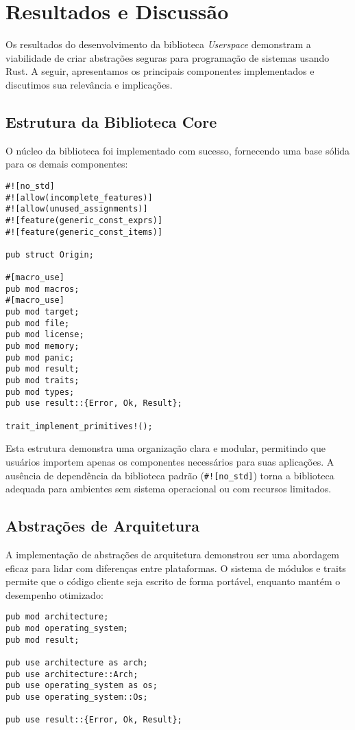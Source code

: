\documentclass[12pt,a4paper]{article}
\begin{document}
\section{Resultados e Discussão}

Os resultados do desenvolvimento da biblioteca \textit{Userspace} demonstram a viabilidade de criar abstrações seguras para programação de sistemas usando Rust. A seguir, apresentamos os principais componentes implementados e discutimos sua relevância e implicações.

\subsection{Estrutura da Biblioteca Core}

O núcleo da biblioteca foi implementado com sucesso, fornecendo uma base sólida para os demais componentes:

\begin{lstlisting}
#![no_std]
#![allow(incomplete_features)]
#![allow(unused_assignments)]
#![feature(generic_const_exprs)]
#![feature(generic_const_items)]

pub struct Origin;

#[macro_use]
pub mod macros;
#[macro_use]
pub mod target;
pub mod file;
pub mod license;
pub mod memory;
pub mod panic;
pub mod result;
pub mod traits;
pub mod types;
pub use result::{Error, Ok, Result};

trait_implement_primitives!();
\end{lstlisting}

Esta estrutura demonstra uma organização clara e modular, permitindo que usuários importem apenas os componentes necessários para suas aplicações. A ausência de dependência da biblioteca padrão (\texttt{\#![no\_std]}) torna a biblioteca adequada para ambientes sem sistema operacional ou com recursos limitados.

\subsection{Abstrações de Arquitetura}

A implementação de abstrações de arquitetura demonstrou ser uma abordagem eficaz para lidar com diferenças entre plataformas. O sistema de módulos e traits permite que o código cliente seja escrito de forma portável, enquanto mantém o desempenho otimizado:

\begin{lstlisting}
pub mod architecture;
pub mod operating_system;
pub mod result;

pub use architecture as arch;
pub use architecture::Arch;
pub use operating_system as os;
pub use operating_system::Os;

pub use result::{Error, Ok, Result};
\end{lstlisting}
\end{document}
